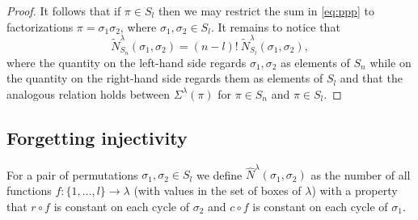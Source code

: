 \documentclass[12pt]{amsart}
\theoremstyle{plain}
\newtheorem{proposition}[lemma]{Proposition}
\theoremstyle{remark}
\begin{document}
\begin{proof}
It follows that if $\pi\in S_l$ then we may restrict the sum in \eqref{eq:ppp} to
factorizations $\pi=\sigma_1 \sigma_2$, where $\sigma_1,\sigma_2\in S_l$.
It remains to notice that 
$$ \tilde{N}_{S_n}^{\lambda}(\sigma_1,\sigma_2) =
(n-l)! \ \tilde{N}_{S_l}^{\lambda}(\sigma_1,\sigma_2), $$
where the quantity on the left-hand side regards $\sigma_1,\sigma_2$ as
elements of $S_n$ while on the quantity on the right-hand side regards them as
elements of $S_l$ and that the analogous relation holds between
$\Sigma^\lambda(\pi)$ for $\pi\in S_n$ and $\pi\in S_l$.
\end{proof}


\subsection{Forgetting injectivity}


For a pair of permutations $\sigma_1,\sigma_2\in S_l$ we define 
$\hat{N}^{\lambda}(\sigma_1,\sigma_2)$ 
as the number of all functions 
$f:\{1,\dots,l\}\rightarrow \lambda$ (with values in the set of boxes of $\lambda$)
with a property that $r\circ f$ is constant 
on each cycle of $\sigma_2$ and $c\circ f$ is constant on each cycle of $\sigma_1$.
\end{document}

